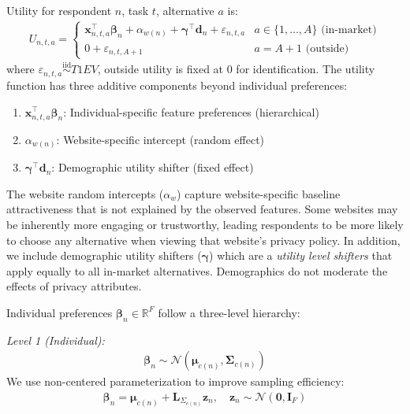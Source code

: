 \documentclass[12pt]{article}
\theoremstyle{definition}
\theoremstyle{remark}
\begin{document}
\begin{appendix}
Utility for respondent $n$, task $t$, alternative $a$ is:
\begin{align*}
  U_{n,t,a} = 
  \begin{cases}
    \bm x_{n,t,a}^\top \boldsymbol{\beta}_{n} + \alpha_{w(n)} + \boldsymbol{\gamma}^\top \bm d_n + \varepsilon_{n,t,a} & a \in \{1,\dots,A\} \text{ (in-market)} \\[0.3em]
    0 + \varepsilon_{n,t,A+1} & a = A+1 \text{ (outside)}
  \end{cases}
\end{align*}
where $\varepsilon_{n,t,a} \overset{\text{iid}}{\sim} T1EV$, outside utility is fixed at 0 for identification. The utility function has three additive components beyond individual preferences:
\begin{enumerate}[leftmargin=*,nosep]
  \item $\bm x_{n,t,a}^\top \boldsymbol{\beta}_{n}$: Individual-specific feature preferences (hierarchical)
  \item $\alpha_{w(n)}$: Website-specific intercept (random effect)
  \item $\boldsymbol{\gamma}^\top \bm d_n$: Demographic utility shifter (fixed effect)
\end{enumerate}

The website random intercepts ($\alpha_w$) capture website-specific baseline attractiveness that is not explained by the observed features. Some websites may be inherently more engaging or trustworthy, leading respondents to be more likely to choose any alternative when viewing that website's privacy policy. In addition, we include demographic utility shifters ($\boldsymbol{\gamma}$) which are a \emph{utility level shifters} that apply equally to all in-market alternatives. Demographics do not moderate the effects of privacy attributes.

Individual preferences $\boldsymbol{\beta}_{n} \in \mathbb{R}^F$ follow a three-level hierarchy:

\emph{Level 1 (Individual):} 
\begin{align*}
  \boldsymbol{\beta}_{n} \sim \mathcal{N}(\boldsymbol{\mu}_{c(n)}, \boldsymbol{\Sigma}_{c(n)})
\end{align*}
We use non-centered parameterization to improve sampling efficiency:
\begin{align*}
  \boldsymbol{\beta}_{n} = \boldsymbol{\mu}_{c(n)} + \mathbf{L}_{\Sigma_{c(n)}} \bm z_n, \quad \bm z_n \sim \mathcal{N}(\mathbf{0}, \mathbf{I}_F)
\end{align*}


\end{appendix}
\end{document}

